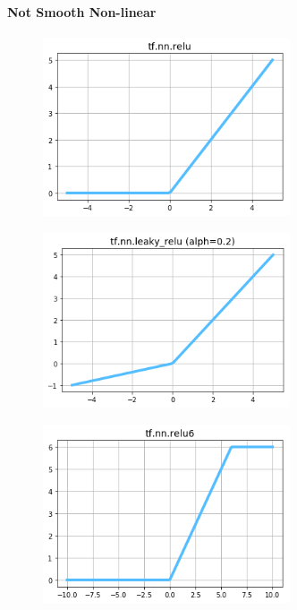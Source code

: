 \paragraph{Not Smooth Non-linear}

\begin{figure}
\centering
\includegraphics[width=0.65\textwidth]{./sync_imgs/act/notsmooth/relu.png}
\label{fig:act_notsmooth_relu}
\end{figure}

\begin{figure}
\centering
\includegraphics[width=0.65\textwidth]{./sync_imgs/act/notsmooth/leakyrelu.png}
\label{fig:act_notsmooth_leakyrelu}
\end{figure}

\begin{figure}
\centering
\includegraphics[width=0.65\textwidth]{./sync_imgs/act/notsmooth/relu6.png}
\label{fig:act_notsmooth_relu6}
\end{figure}

